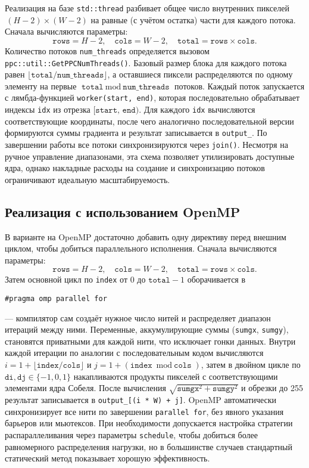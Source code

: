 \documentclass[12pt]{article}
\begin{document}
Реализация на базе \texttt{std::thread} разбивает общее число внутренних пикселей \(\,(H-2)\times(W-2)\) на равные (с учётом остатка) части для каждого потока. Сначала вычисляются параметры:
\[
    \texttt{rows} = H - 2,\quad \texttt{cols} = W - 2,\quad \texttt{total} = \texttt{rows} \times \texttt{cols}.
\]
Количество потоков \texttt{num\_threads} определяется вызовом 
\lstinline[breaklines]{ppc::util::GetPPCNumThreads()}. 
Базовый размер блока для каждого потока равен $\lfloor \texttt{total}/\texttt{num\_threads}\rfloor$, а оставшиеся пиксели распределяются по одному элементу на первые $\texttt{total} \bmod \texttt{num\_threads}$ потоков. Каждый поток запускается с лямбда-функцией \texttt{worker(start, end)}, которая последовательно обрабатывает индексы \texttt{idx} из отрезка \([\texttt{start},\,\texttt{end})\). Для каждого \texttt{idx} вычисляются соответствующие координаты, после чего аналогично последовательной версии формируются суммы градиента и результат записывается в \texttt{output\_}. По завершении работы все потоки синхронизируются через \texttt{join()}. Несмотря на ручное управление диапазонами, эта схема позволяет утилизировать доступные ядра, однако накладные расходы на создание и синхронизацию потоков ограничивают идеальную масштабируемость.

\subsection{Реализация с использованием OpenMP}

В варианте на OpenMP достаточно добавить одну директиву перед внешним циклом, чтобы добиться параллельного исполнения. Сначала вычисляются параметры:
\[
    \texttt{rows} = H - 2,\quad \texttt{cols} = W - 2,\quad \texttt{total} = \texttt{rows} \times \texttt{cols}.
\]
Затем основной цикл по \texttt{index} от 0 до \(\texttt{total}-1\) оборачивается в
\begin{verbatim}
#pragma omp parallel for
\end{verbatim}
— компилятор сам создаёт нужное число нитей и распределяет диапазон итераций между ними. Переменные, аккумулирующие суммы (\texttt{sumgx}, \texttt{sumgy}), становятся приватными для каждой нити, что исключает гонки данных. Внутри каждой итерации по аналогии с последовательным кодом вычисляются $i = 1 + \bigl\lfloor \texttt{index}/\texttt{cols}\bigr\rfloor$ и $j = 1 + (\texttt{index} \bmod \texttt{cols})$, затем в двойном цикле по \(\texttt{di}, \texttt{dj} \in \{-1,0,1\}\) накапливаются продукты пикселей с соответствующими элементами ядра Собеля. После вычисления $\sqrt{\texttt{sumgx}^2 + \texttt{sumgy}^2}$ и обрезки до 255 результат записывается в \texttt{output\_[(i * W) + j]}. OpenMP автоматически синхронизирует все нити по завершении \verb|parallel for|, без явного указания барьеров или мьютексов. При необходимости допускается настройка стратегии распараллеливания через параметры \verb|schedule|, чтобы добиться более равномерного распределения нагрузки, но в большинстве случаев стандартный статический метод показывает хорошую эффективность.
\end{document}
